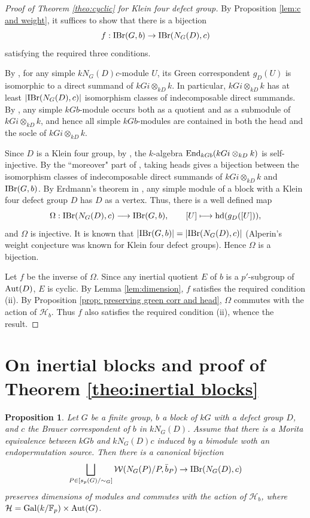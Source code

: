 \documentclass[preprint,12pt,3p]{elsarticle}
\newtheorem{proposition}[theorem]{Proposition}%
\def\IBr{{\rm IBr}}
\def\Aut{{\rm Aut}}
\def\End{{\rm End}}
\def\Gal{{\rm Gal}}
\def\W{\mathcal{W}}
\def\H{\mathcal{H}}
\def\F{\mathbb{F}}
\def\hd{{\rm hd}}
\begin{document}
\begin{proof}[Proof of Theorem \ref{theo:cyclic} for Klein four defect group]
By Proposition \ref{lem:c and weight}, it suffices to show that there is a bijection
$$f:\IBr(G,b)\to\IBr(N_G(D),c)$$
satisfying the required three conditions.

 
By \cite[Theorem 1.3]{KL2025}, for any simple $kN_G(D)c$-module $U$, its Green correspondent $g_D(U)$ is isomorphic to a direct summand of $kGi\otimes_{kD}k$. In particular, $kGi\otimes_{kD}k$ has at least $|\IBr(N_G(D),c)|$ isomorphism classes of indecomposable direct summands.
By \cite[Theorem 1.4]{KL2025}, any simple $kGb$-module occurs both as a quotient and as a submodule of $kGi\otimes_{kD} k$, and hence all simple $kGb$-modules are contained in both the head and the socle of $kGi\otimes_{kD}k$.

Since $D$ is a Klein four group, by \cite[Theorem 1.10]{KL2025}, the $k$-algebra $\End_{kGb}(kGi\otimes_{kD} k)$ is self-injective.
By the ``moreover" part of \cite[Theorem 2.13 (b)]{Geck}, taking heads gives a bijection between the isomorphism classes of indecomposable direct summands of $kGi\otimes_{kD}k$ and $\IBr(G,b)$. By Erdmann's theorem in \cite{Erdmann}, any simple module of a block with a Klein four defect group $D$ has $D$ as a vertex. Thus, there is a well defined map
$$\Omega:\IBr(N_G(D),c) \longrightarrow \IBr(G,b),\qquad [U]\longmapsto \hd(g_D([U])),$$
and $\Omega$ is injective. It is known that $|\IBr(G,b)|=|\IBr(N_G(D),c)|$ (Alperin's weight conjecture was known for Klein four defect groups). Hence $\Omega$ is a bijection. 

Let $f$ be the inverse of $\Omega$. Since any inertial quotient $E$ of $b$ is a $p'$-subgroup of $\Aut(D)$, $E$ is cyclic. By Lemma \ref{lem:dimension}, $f$ satisfies the required condition (ii). By Proposition \ref{prop: preserving green corr and head}, $\Omega$ commutes with the action of $\H_b$. Thus $f$ also satisfies the required condition (ii), whence the result.
\end{proof}




\section{On inertial blocks and proof of Theorem \ref{theo:inertial blocks}}\label{s4}

\begin{proposition}\label{prop:inertial block, c and weight}
Let $G$ be a finite group, $b$ a block of $kG$ with a defect group $D$, and $c$ the Brauer correspondent of $b$ in $kN_G(D)$. Assume that there is a Morita equivalence between $kGb$ and $kN_G(D)c$ induced by a bimodule woth an endopermutation source. Then there is a canonical bijection 
$$\bigsqcup_{P\in [s_p(G)/\sim_G]}\W(N_G(P)/P,\bar{b}_P)\to \IBr(N_G(D),c)$$ 
preserves dimensions of modules and commutes with the action of $\H_b$, where $\H=\Gal(k/\F_p)\times \Aut(G)$.
\end{proposition}
\end{document}
